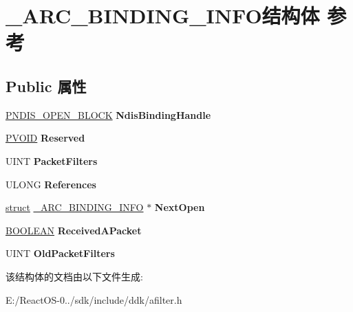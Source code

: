 \hypertarget{struct___a_r_c___b_i_n_d_i_n_g___i_n_f_o}{}\section{\+\_\+\+A\+R\+C\+\_\+\+B\+I\+N\+D\+I\+N\+G\+\_\+\+I\+N\+F\+O结构体 参考}
\label{struct___a_r_c___b_i_n_d_i_n_g___i_n_f_o}
\subsection*{Public 属性}
\begin{DoxyCompactItemize}
\item 
\mbox{\label{struct___a_r_c___b_i_n_d_i_n_g___i_n_f_o_aade7433d357f90ab8aa92adcc8169528}} 
\hyperlink{struct___n_d_i_s___o_p_e_n___b_l_o_c_k}{P\+N\+D\+I\+S\+\_\+\+O\+P\+E\+N\+\_\+\+B\+L\+O\+CK} {\bfseries Ndis\+Binding\+Handle}
\item 
\mbox{\label{struct___a_r_c___b_i_n_d_i_n_g___i_n_f_o_a8b8219000a0ceb4daef4c2e0d38398ce}} 
\hyperlink{interfacevoid}{P\+V\+O\+ID} {\bfseries Reserved}
\item 
\mbox{\label{struct___a_r_c___b_i_n_d_i_n_g___i_n_f_o_afd998e84580b2f9e297dff31d2118b4d}} 
U\+I\+NT {\bfseries Packet\+Filters}
\item 
\mbox{\label{struct___a_r_c___b_i_n_d_i_n_g___i_n_f_o_a6d1a98c673fd40ee1698cf762d2ca004}} 
U\+L\+O\+NG {\bfseries References}
\item 
\mbox{\label{struct___a_r_c___b_i_n_d_i_n_g___i_n_f_o_ad36bbdb51fbea1b512588286a7078d36}} 
\hyperlink{interfacestruct}{struct} \hyperlink{struct___a_r_c___b_i_n_d_i_n_g___i_n_f_o}{\+\_\+\+A\+R\+C\+\_\+\+B\+I\+N\+D\+I\+N\+G\+\_\+\+I\+N\+FO} $\ast$ {\bfseries Next\+Open}
\item 
\mbox{\label{struct___a_r_c___b_i_n_d_i_n_g___i_n_f_o_a96a0d43eef0c278b2d85a97f370890e3}} 
\hyperlink{_processor_bind_8h_a112e3146cb38b6ee95e64d85842e380a}{B\+O\+O\+L\+E\+AN} {\bfseries Received\+A\+Packet}
\item 
\mbox{\label{struct___a_r_c___b_i_n_d_i_n_g___i_n_f_o_ae17cddf72d30be51c1525975da91c625}} 
U\+I\+NT {\bfseries Old\+Packet\+Filters}
\end{DoxyCompactItemize}


该结构体的文档由以下文件生成\+:\begin{DoxyCompactItemize}
\item 
E\+:/\+React\+O\+S-\/0../sdk/include/ddk/afilter.\+h\end{DoxyCompactItemize}
